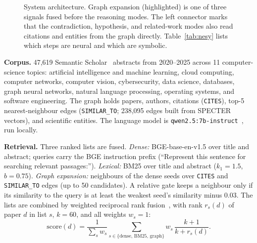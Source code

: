 \documentclass[conference]{IEEEtran}
\begin{document}
\begin{figure}[t]
\caption{System architecture. Graph expansion (highlighted) is one of three signals fused before the reasoning modes. The left connector marks that the contradiction, hypothesis, and related-work modes also read citations and entities from the graph directly. Table~\ref{tab:nesy} lists which steps are neural and which are symbolic.}
\label{fig:arch}
\end{figure}

\textbf{Corpus.} 47,619 Semantic Scholar~\cite{kinney2023s2} abstracts from 2020--2025 across 11 computer-science topics: artificial intelligence and machine learning, cloud computing, computer networks, computer vision, cybersecurity, data science, databases, graph neural networks, natural language processing, operating systems, and software engineering. The graph holds papers, authors, citations (\texttt{CITES}), top-5 nearest-neighbour edges (\texttt{SIMILAR\_TO}; 238,095 edges built from SPECTER vectors), and scientific entities. The language model is \texttt{qwen2.5:7b-instruct}~\cite{qwen2024qwen25}, run locally.

\textbf{Retrieval.} Three ranked lists are fused. \emph{Dense:} BGE-base-en-v1.5 over title and abstract; queries carry the BGE instruction prefix (``Represent this sentence for searching relevant passages:''). \emph{Lexical:} BM25 over title and abstract ($k_1 = 1.5$, $b = 0.75$). \emph{Graph expansion:} neighbours of the dense seeds over \texttt{CITES} and \texttt{SIMILAR\_TO} edges (up to 50 candidates). A relative gate keeps a neighbour only if its similarity to the query is at least the weakest seed's similarity minus 0.03. The lists are combined by weighted reciprocal rank fusion~\cite{cormack2009rrf}, with rank $r_s(d)$ of paper $d$ in list $s$, $k = 60$, and all weights $w_s = 1$:
\begin{equation}
\mathrm{score}(d) = \frac{1}{\sum_{s} w_s} \sum_{s \in \{\mathrm{dense},\, \mathrm{BM25},\, \mathrm{graph}\}} w_s \, \frac{k + 1}{k + r_s(d)} .
\end{equation}
\end{document}
